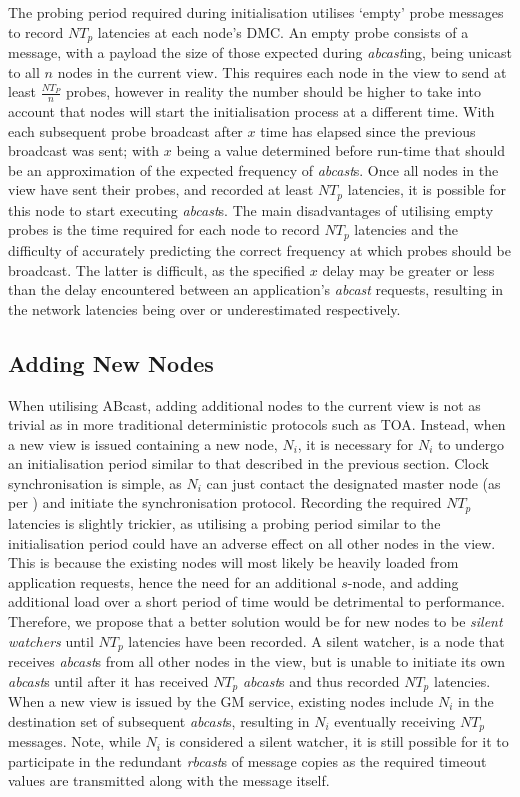     The probing period required during initialisation utilises \textquoteleft{}empty' probe messages to record $NT_p$ latencies at each node's DMC.  An empty probe consists of a message, with a payload the size of those expected during \emph{abcast}ing, being unicast to all $n$ nodes in the current view.  This requires each node in the view to send at least $\frac{NT_P}{n}$ probes, however in reality the number should be higher to take into account that nodes will start the initialisation process at a different time.  With each subsequent probe broadcast after $x$ time has elapsed since the previous broadcast was sent; with $x$ being a value determined before run-time that should be an approximation of the expected frequency of \emph{abcast}s.  Once all nodes in the view have sent their probes, and recorded at least $NT_p$ latencies, it is possible for this node to start executing \emph{abcast}s.  The main disadvantages of utilising empty probes is the time required for each node to record $NT_p$ latencies and the difficulty of accurately predicting the correct frequency at which probes should be broadcast.  The latter is difficult, as the specified $x$ delay may be greater or less than the delay encountered between an application's \emph{abcast} requests, resulting in the network latencies being over or underestimated respectively.  
    
    \subsection{Adding New Nodes}
    When utilising \textsf{ABcast}, adding additional nodes to the current view is not as trivial as in more traditional deterministic protocols such as TOA.  Instead, when a new view is issued containing a new node, $N_i$, it is necessary for $N_i$ to undergo an initialisation period similar to that described in the previous section.  Clock synchronisation is simple, as $N_i$ can just contact the designated master node (as per \citep{Cristian:1996:SA:227210.227231}) and initiate the synchronisation protocol.  Recording the required $NT_p$ latencies is slightly trickier, as utilising a probing period similar to the initialisation period could have an adverse effect on all other nodes in the view.  This is because the existing nodes will most likely be heavily loaded from application requests, hence the need for an additional $s$-node, and adding additional load over a short period of time would be detrimental to performance.  Therefore, we propose that a better solution would be for new nodes to be \emph{silent watchers} until $NT_p$ latencies have been recorded.  A silent watcher, is a node that receives \emph{abcast}s from all other nodes in the view, but is unable to initiate its own \emph{abcast}s until after it has received $NT_p$ \emph{abcast}s and thus recorded $NT_p$ latencies.  When a new view is issued by the GM service, existing nodes include $N_i$ in the destination set of subsequent \emph{abcast}s, resulting in $N_i$ eventually receiving $NT_p$ messages.  Note, while $N_i$ is considered a silent watcher, it is still possible for it to participate in the redundant \emph{rbcast}s of message copies as the required timeout values are transmitted along with the message itself.      
    
